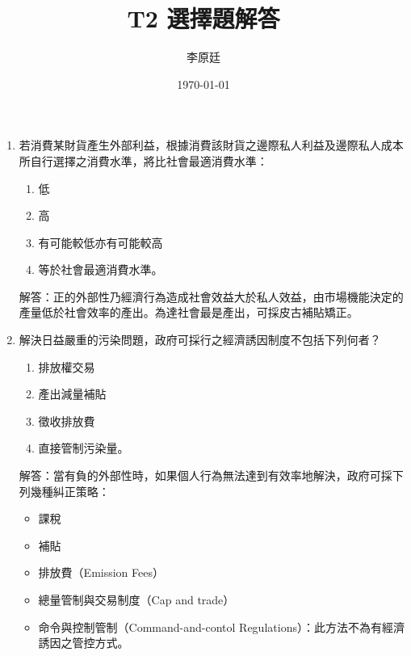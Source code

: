 \documentclass[12pt, a4paper]{article}
\begin{document}
\title{T2 選擇題解答} %
\author{李原廷} %
\date{\today} %

\maketitle

\begin{enumerate}

    \item 若消費某財貨產生外部利益，根據消費該財貨之邊際私人利益及邊際私人成本所自行選擇之消費水準，將比社會最適消費水準：
    \begin{enumerate}[label=\Alph*.]
        \item 低
        \item 高
        \item 有可能較低亦有可能較高
        \item 等於社會最適消費水準。
    \end{enumerate}
    解答：正的外部性乃經濟行為造成社會效益大於私人效益，由市場機能決定的產量低於社會效率的產出。為達社會最是產出，可採皮古補貼矯正。

    \item 解決日益嚴重的污染問題，政府可採行之經濟誘因制度不包括下列何者？
    \begin{enumerate}[label=\Alph*.]
        \item 排放權交易
        \item 產出減量補貼
        \item 徵收排放費
        \item 直接管制污染量。
    \end{enumerate}
    解答：當有負的外部性時，如果個人行為無法達到有效率地解決，政府可採下列幾種糾正策略：
    \begin{itemize}
        \item 課稅
        \item 補貼
        \item 排放費（Emission Fees）
        \item 總量管制與交易制度（Cap and trade）
        \item 命令與控制管制（Command-and-contol Regulations）：此方法不為有經濟誘因之管控方式。
    \end{itemize}


\end{enumerate}
\end{document}
